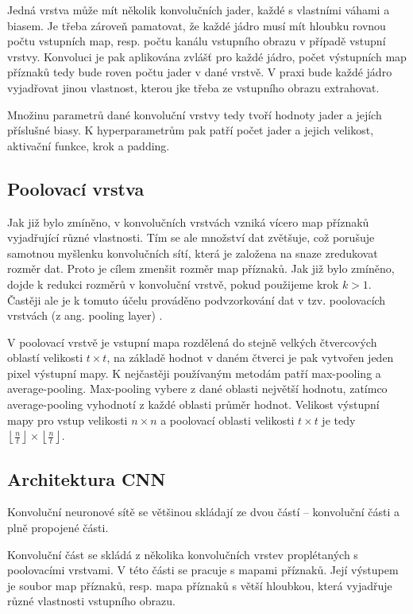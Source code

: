 Jedná vrstva může mít několik konvolučních jader, každé s vlastními váhami a
biasem. Je třeba zároveň pamatovat, že každé jádro musí mít hloubku rovnou
počtu vstupních map, resp. počtu kanálu vstupního obrazu v případě vstupní
vrstvy. Konvoluci je pak aplikována zvlášť pro každé jádro, počet výstupních map
příznaků tedy bude roven počtu jader v dané vrstvě. V praxi bude každé jádro
vyjadřovat jinou vlastnost, kterou jke třeba ze vstupního obrazu extrahovat.

Množinu parametrů dané konvoluční vrstvy tedy tvoří hodnoty jader a jejích
příslušné biasy. K hyperparametrům pak patří počet jader a jejich velikost,
aktivační funkce, krok a padding.

\subsection{Poolovací vrstva}
Jak již bylo zmíněno, v konvolučních vrstvách vzniká vícero map příznaků
vyjadřující různé vlastnosti. Tím se ale množství dat zvětšuje, což porušuje
samotnou myšlenku konvolučních sítí, která je založena na snaze zredukovat
rozměr dat. Proto je cílem zmenšit rozměr map příznaků. Jak již bylo
zmíněno, dojde k redukci rozměrů v konvoluční vrstvě, pokud použijeme krok $k >
    1$. Častěji ale je k tomuto účelu prováděno podvzorkování dat v tzv.
poolovacích vrstvách (z ang. pooling layer) \cite{rawat2017deep}.

V poolovací vrstvě je vstupní mapa rozdělená do stejně velkých čtvercových
oblastí velikosti $t \times t$, na základě hodnot v daném čtverci je pak
vytvořen jeden pixel výstupní mapy. K nejčastěji používaným metodám patří
max-pooling a average-pooling. Max-pooling vybere z dané oblasti největší
hodnotu, zatímco average-pooling vyhodnotí z každé oblasti průměr hodnot.
Velikost výstupní mapy pro vstup velikosti $n \times n$ a poolovací oblasti
velikosti $t \times t$ je tedy $\left\lfloor \frac{n}{t} \right\rfloor \times
    \left\lfloor \frac{n}{t} \right\rfloor$.

\subsection{Architektura CNN}

Konvoluční neuronové sítě se většinou skládají ze dvou částí – konvoluční části a plně
propojené části.

Konvoluční část se skládá z několika konvolučních vrstev proplétaných s
poolovacími vrstvami. V této části se pracuje s mapami příznaků. Její výstupem
je soubor map příznaků, resp. mapa příznaků s větší hloubkou, která vyjadřuje
různé vlastnosti vstupního obrazu.

